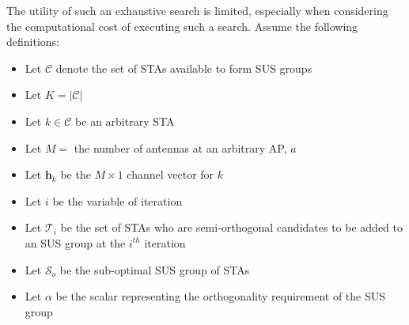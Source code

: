 The utility of such an exhaustive search is limited, especially when considering the computational cost of executing such a search.
Assume the following definitions:
\begin{itemize}
    \item Let $\mathcal{C}$ denote the set of STAs available to form SUS groups
    \item Let $K = \vert \mathcal{C} \vert $
    \item Let $k \in \mathcal{C}$ be an arbitrary STA
    \item Let $M = $ the number of antennas at an arbitrary AP, $a$
    \item Let $\textbf{h}_k$ be the $M \times 1$ channel vector for $k$
    \item Let $i$ be the variable of iteration
    \item Let $\mathcal{T}_i$ be the set of STAs who are semi-orthogonal candidates to be added to an SUS group at the $i^{th}$ iteration
    \item Let $\mathcal{S}_o$ be the sub-optimal SUS group of STAs
    \item Let $\alpha$ be the scalar representing the orthogonality requirement of the SUS group
\end{itemize}

